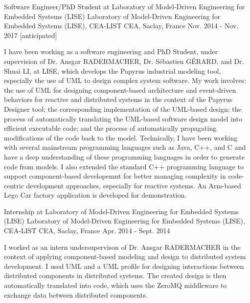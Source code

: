 \begin{cventries}
\cventry
{Software Engineer/PhD Student at Laboratory of Model-Driven Engineering for Embedded Systems (LISE)} %
{Laboratory of Model-Driven Engineering for Embedded Systems (LISE), CEA-LIST} %
{CEA, Saclay, France} %
{Nov. 2014 - Nov. 2017 [anticipated]} %
{ %
	\begin{cvitems}
		\item {I have been working as a software engineering and PhD Student, under supervision of Dr. Ansgar RADERMACHER, Dr. S\'ebastien G\'ERARD, and Dr. Shuai LI, at LISE, which develops the Papyrus industrial modeling tool, especially the use of UML to design complex system software. My work involves: the use of UML for designing component-based architecture and event-driven behaviors for reactive and distributed systems in the context of the Papyrus Designer tool; the corresponding implementation of the UML-based design; the process of automatically translating the UML-based software design model into efficient executable code; and the process of automatically propagating modifications of the code back to the model. Technically, I have been working with several mainstream programming languages such as Java, C++, and C and have a deep understanding of these programming languages in order to generate code from models. I also extended the standard C++ programming language to support component-based developemnt for better managing complexity in code-centric development approaches, especially for reactive systems. An Arm-based Lego Car factory application is developed for demonstration.}		
	\end{cvitems}
}


\cventry
{Internship at Laboratory of Model-Driven Engineering for Embedded Systems (LISE)} %
{Laboratory of Model-Driven Engineering for Embedded Systems (LISE), CEA-LIST} %
{CEA, Saclay, France} %
{Apr. 2014 - Sept. 2014} %
{ %
	\begin{cvitems}
		\item {I worked as an intern undersupervison of Dr. Ansgar RADERMACHER in the context of applying component-based modeling and design to distributed system development. I used UML and a UML profile for designing interactions between distributed components in distributed systems. The created design is then automatically translated into code, which uses the ZeroMQ middleware to exchange data between distributed components.}		
	\end{cvitems}
}



\end{cventries}
